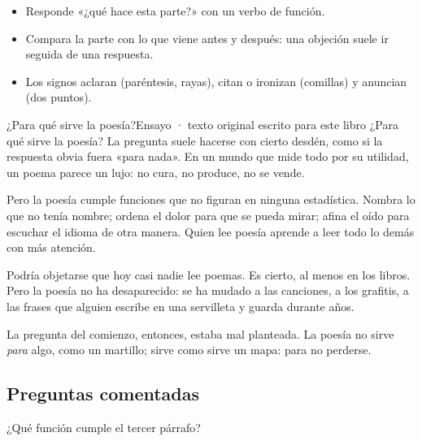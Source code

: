\begin{regla}
\begin{itemize}
  \item Responde «¿qué hace esta parte?» con un verbo de función.
  \item Compara la parte con lo que viene antes y después: una objeción suele ir seguida de una respuesta.
  \item Los signos aclaran (paréntesis, rayas), citan o ironizan (comillas) y anuncian (dos puntos).
\end{itemize}
\end{regla}

\begin{texto}{¿Para qué sirve la poesía?}{Ensayo · texto original escrito para este libro}
\pa ¿Para qué sirve la poesía? La pregunta suele hacerse con cierto desdén, como si la respuesta obvia fuera «para nada».
En un mundo que mide todo por su utilidad, un poema parece un lujo: no cura, no produce, no se vende.

\pa Pero la poesía cumple funciones que no figuran en ninguna estadística. Nombra lo que no tenía nombre; ordena el dolor
para que se pueda mirar; afina el oído para escuchar el idioma de otra manera. Quien lee poesía aprende a leer todo lo
demás con más atención.

\pa Podría objetarse que hoy casi nadie lee poemas. Es cierto, al menos en los libros. Pero la poesía no ha desaparecido:
se ha mudado a las canciones, a los grafitis, a las frases que alguien escribe en una servilleta y guarda durante años.

\pa La pregunta del comienzo, entonces, estaba mal planteada. La poesía no sirve \emph{para} algo, como un martillo; sirve
como sirve un mapa: para no perderse.
\end{texto}

\subsection{Preguntas comentadas}
\begin{comentada}{¿Qué función cumple el tercer párrafo?}
\end{comentada}

